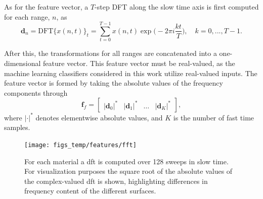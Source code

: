 
As for the feature vector, a $T$-step DFT along the slow time axis is first computed for each range, $n$, as
\begin{equation}
	\mathbf{d}_n=\text{DFT}\big\{x(n,t)\big\}_t =  \sum_{t=0}^{T-1}x(n,t)\exp\Big(-2\pi i\frac{kt}{T}\Big), \quad k=0,...,T-1.
\end{equation}

After this, the transformations for all ranges are concatenated into a one-dimensional feature vector. This feature vector must be real-valued, as the machine learning classifiers considered in this work utilize real-valued inputs. The feature vector is formed by taking the absolute values of the frequency components through
\begin{equation}
	\textbf{f}_{f}=\begin{bmatrix} |\mathbf{d}_0|^* & |\mathbf{d}_1|^* & \hdots & |\mathbf{d}_K|^* \end{bmatrix},
\end{equation}
where $|\cdot|^*$ denotes elementwise absolute values, and $K$ is the number of fast time samples.    



\begin{figure}[h]
	\centering
	\texttt{[image: figs\_temp/features/fft]}
	\caption{For each material a \gls{dft} is computed over 128 sweeps in slow time. For visualization purposes the square root of the absolute values of the complex-valued \gls{dft} is shown, highlighting differences in frequency content of the different surfaces.}
	\label{fig:fft}
\end{figure}


